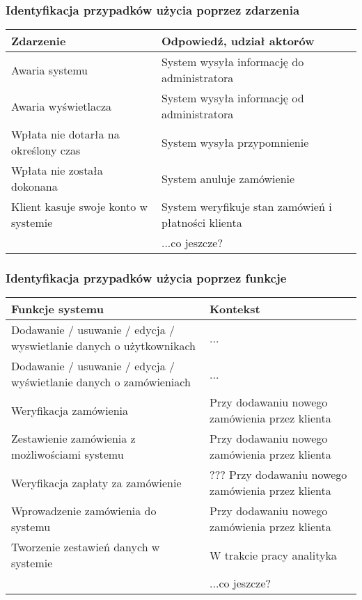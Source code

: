 \documentclass[10pt,a4paper,titlepage]{article} %
\begin{document}
		\subsubsection{Identyfikacja przypadków użycia poprzez zdarzenia}
		\begin {center}
		\begin{tabular}{|p{6cm}|p{6cm}|}
		  \hline
		  {\bf Zdarzenie} & {\bf Odpowiedź, udział aktorów} \\ \hline
		  \hline
		  Awaria systemu & System wysyła informację do administratora \\ \hline
		  Awaria wyświetlacza & System wysyła informację od administratora \\ \hline
		  Wpłata nie dotarła na określony czas & System wysyła przypomnienie \\ \hline
		  Wpłata nie została dokonana & System anuluje zamówienie \\ \hline
		  Klient kasuje swoje konto w systemie & System weryfikuje stan zamówień i płatności klienta \\ \hline
		  & ...co jeszcze? \\ \cline{2-2}
		  \hline
		\end{tabular}
		\end{center}
		\subsubsection{Identyfikacja przypadków użycia poprzez funkcje}
		\begin {center}
		\begin{tabular}{|p{6cm}|p{6cm}|}
		  \hline
		  {\bf Funkcje systemu} & {\bf Kontekst} \\ \hline
		  \hline
		  Dodawanie / usuwanie / edycja / wyswietlanie danych o użytkownikach & ... \\ \hline
		  Dodawanie / usuwanie / edycja / wyświetlanie danych o zamówieniach & ... \\ \hline
		  Weryfikacja zamówienia & Przy dodawaniu nowego zamówienia przez klienta \\ \hline
		  Zestawienie zamówienia z możliwościami systemu & Przy dodawaniu nowego zamówienia przez klienta \\ \hline
		  Weryfikacja zapłaty za zamówienie & ??? Przy dodawaniu nowego zamówienia przez klienta \\ \hline
		  Wprowadzenie zamówienia do systemu & Przy dodawaniu nowego zamówienia przez klienta \\ \hline
		  Tworzenie zestawień danych w systemie & W trakcie pracy analityka \\ \hline
		  & ...co jeszcze? \\ \cline{2-2}
		  \hline
		\end{tabular}
		\end{center}
\end{document}
